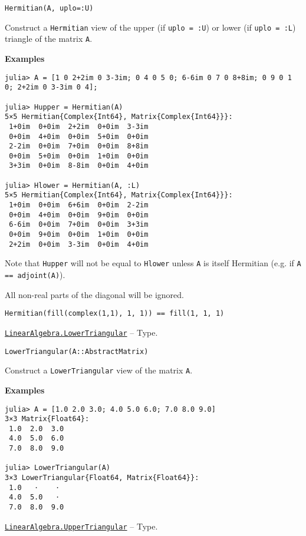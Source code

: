 \begin{adjustwidth}{2em}{0pt}


\begin{verbatim}
Hermitian(A, uplo=:U)
\end{verbatim}

Construct a \texttt{Hermitian} view of the upper (if \texttt{uplo = :U}) or lower (if \texttt{uplo = :L}) triangle of the matrix \texttt{A}.

\textbf{Examples}


\begin{verbatim}
julia> A = [1 0 2+2im 0 3-3im; 0 4 0 5 0; 6-6im 0 7 0 8+8im; 0 9 0 1 0; 2+2im 0 3-3im 0 4];

julia> Hupper = Hermitian(A)
5×5 Hermitian{Complex{Int64}, Matrix{Complex{Int64}}}:
 1+0im  0+0im  2+2im  0+0im  3-3im
 0+0im  4+0im  0+0im  5+0im  0+0im
 2-2im  0+0im  7+0im  0+0im  8+8im
 0+0im  5+0im  0+0im  1+0im  0+0im
 3+3im  0+0im  8-8im  0+0im  4+0im

julia> Hlower = Hermitian(A, :L)
5×5 Hermitian{Complex{Int64}, Matrix{Complex{Int64}}}:
 1+0im  0+0im  6+6im  0+0im  2-2im
 0+0im  4+0im  0+0im  9+0im  0+0im
 6-6im  0+0im  7+0im  0+0im  3+3im
 0+0im  9+0im  0+0im  1+0im  0+0im
 2+2im  0+0im  3-3im  0+0im  4+0im
\end{verbatim}

Note that \texttt{Hupper} will not be equal to \texttt{Hlower} unless \texttt{A} is itself Hermitian (e.g. if \texttt{A == adjoint(A)}).

All non-real parts of the diagonal will be ignored.


\begin{verbatim}
Hermitian(fill(complex(1,1), 1, 1)) == fill(1, 1, 1)
\end{verbatim}



\end{adjustwidth}
\hypertarget{15116078732779234709}{}
\hyperlink{15116078732779234709}{\texttt{LinearAlgebra.LowerTriangular}}  -- {Type.}

\begin{adjustwidth}{2em}{0pt}


\begin{verbatim}
LowerTriangular(A::AbstractMatrix)
\end{verbatim}

Construct a \texttt{LowerTriangular} view of the matrix \texttt{A}.

\textbf{Examples}


\begin{verbatim}
julia> A = [1.0 2.0 3.0; 4.0 5.0 6.0; 7.0 8.0 9.0]
3×3 Matrix{Float64}:
 1.0  2.0  3.0
 4.0  5.0  6.0
 7.0  8.0  9.0

julia> LowerTriangular(A)
3×3 LowerTriangular{Float64, Matrix{Float64}}:
 1.0   ⋅    ⋅
 4.0  5.0   ⋅
 7.0  8.0  9.0
\end{verbatim}



\end{adjustwidth}
\hypertarget{6344726545165008167}{}
\hyperlink{6344726545165008167}{\texttt{LinearAlgebra.UpperTriangular}}  -- {Type.}

